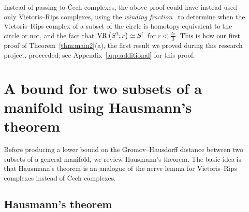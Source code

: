\documentclass[11pt, reqno, english]{amsart}
\begin{document}
Instead of passing to \v{C}ech complexes, the above proof could have instead used only Vietoris--Rips complexes, using the \emph{winding fraction}~\cite{AA-VRS1,AAM,AAR} to determine when the Vietoris--Rips complex of a subset of the circle is homotopy equivalent to the circle or not, and the fact that $\mathrm{VR}\left(S^1;r\right)\simeq S^1$ for $r<\frac{2\pi}{3}$.
This is how our first proof of Theorem~\ref{thm:main2}(a), the first result we proved during this research project, proceeded; see Appendix~\ref{app:additional} for this proof.






\section{A bound for two subsets of a manifold using Hausmann's theorem}\label{sec:manifold-simple-two}

Before producing a lower bound on the Gromov--Hausdorff distance between two subsets of a general manifold, we review Hausmann's theorem.
The basic idea is that Hausmann's theorem is an analogue of the nerve lemma for Vietoris--Rips complexes instead of \v{C}ech complexes.


\subsection*{Hausmann's theorem}
\end{document}
